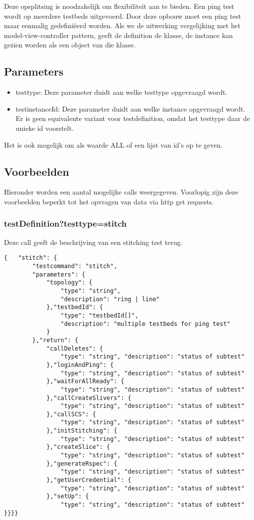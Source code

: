 Deze opsplitsing is noodzakelijk om flexibiliteit aan te bieden. 
Een ping test wordt op meerdere testbeds uitgevoerd. Door deze opbouw moet een ping test maar eenmalig gedefini\"eerd worden. Als we de uitwerking vergelijking met het model-view-controller pattern, geeft de definition de klasse, de instance kan gezien worden als een object van die klasse.

\subsection{Parameters}

\begin{itemize}
\item testtype: Deze parameter duidt aan welke testtype opgevraagd wordt.
\item testinstanceId: Deze parameter duidt aan welke instance opgevraagd wordt. Er is geen equivalente variant voor testdefinition, omdat het testtype daar de unieke id voorstelt.
\end{itemize}
Het is ook mogelijk om als waarde ALL of een lijst van id's op te geven.

\subsection{Voorbeelden}
Hieronder worden een aantal mogelijke calls weergegeven. Voorlopig zijn deze voorbeelden beperkt tot het opvragen van data via http get requests.

\clearpage
\subsubsection{testDefinition?testtype=stitch}
Deze call geeft de beschrijving van een stitching test terug.
\begin{verbatim}
{   "stitch": {
        "testcommand": "stitch",
        "parameters": {
            "topology": {
                "type": "string",
                "description": "ring | line"
            },"testbedId": {
                "type": "testbedId[]",
                "description": "multiple testbeds for ping test"
            }
        },"return": {
            "callDeletes": {
                "type": "string", "description": "status of subtest"
            },"loginAndPing": {
                "type": "string", "description": "status of subtest"
            },"waitForAllReady": {
                "type": "string", "description": "status of subtest"
            },"callCreateSlivers": {
                "type": "string", "description": "status of subtest"
            },"callSCS": {
                "type": "string", "description": "status of subtest"
            },"initStitching": {
                "type": "string", "description": "status of subtest"
            },"createSlice": {
                "type": "string", "description": "status of subtest"
            },"generateRspec": {
                "type": "string", "description": "status of subtest"
            },"getUserCredential": {
                "type": "string", "description": "status of subtest"
            },"setUp": {
                "type": "string", "description": "status of subtest"
}}}}
\end{verbatim}
\clearpage
